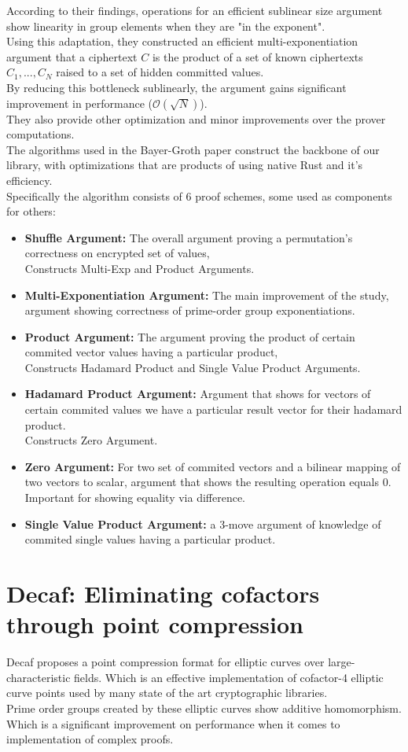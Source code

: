 \documentclass[12pt,a4paper]{report}
\begin{document}
According to their findings, operations for an efficient sublinear size argument
show linearity in group elements when they are "in the exponent". \\
Using this adaptation, they constructed an efficient multi-exponentiation argument that a ciphertext
$C$ is the product of a set of known ciphertexts $C_1,...,C_N$ raised to a set of
hidden committed values. \\ 
By reducing this bottleneck sublinearly, the argument 
gains significant improvement in performance ($\mathcal{O}(\sqrt{N})$).\\
They also provide other optimization and minor improvements over the prover computations.\\
The algorithms used in the Bayer-Groth paper construct the backbone of our library,
with optimizations that are products of using native Rust and it's efficiency.\\
Specifically the algorithm consists of 6 proof schemes, some used as components for others:
\begin{itemize}
	\item \textbf{Shuffle Argument:} The overall argument proving a permutation's correctness on encrypted set of values,\\Constructs Multi-Exp and Product Arguments.
	\item \textbf{Multi-Exponentiation Argument:} The main improvement of the study, argument showing correctness of prime-order group exponentiations.
	\item \textbf{Product Argument:} The argument proving the product of certain commited vector values having a particular product,\\Constructs Hadamard Product and Single Value Product Arguments.
	\item \textbf{Hadamard Product Argument:} Argument that shows for vectors of certain commited values we have a particular result vector for their hadamard product.\\Constructs Zero Argument.
	\item \textbf{Zero Argument:} For two set of commited vectors and a bilinear mapping of two vectors to scalar, argument that shows the resulting operation equals $0$. Important for showing equality via difference.
	\item \textbf{Single Value Product Argument:} a 3-move argument of knowledge of commited single values having a particular product.
\end{itemize}

\section{Decaf: Eliminating cofactors through point compression}
Decaf\cite{decaf} proposes a point compression format for elliptic curves over 
large-characteristic fields. Which is an effective implementation of cofactor-4 elliptic curve points
used by many state of the art cryptographic libraries.\\
Prime order groups created by these elliptic curves show additive homomorphism. Which is a significant
improvement on performance when it comes to implementation of complex proofs.
\end{document}
